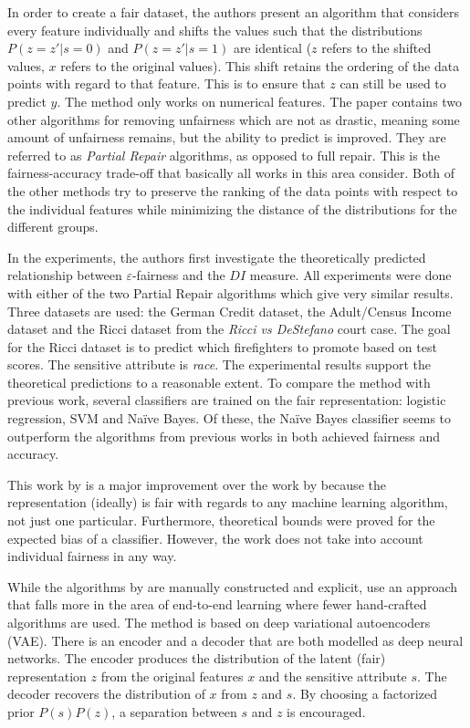 In order to create a fair dataset,
the authors present an algorithm that considers every feature individually
and shifts the values such that the distributions \(P(z=z'|s=0)\) and \(P(z=z'|s=1)\) are identical
(\(z\) refers to the shifted values, \(x\) refers to the original values).
This shift retains the ordering of the data points with regard to that feature.
This is to ensure that \(z\) can still be used to predict \(y\).
The method only works on numerical features.
The paper contains two other algorithms for removing unfairness which are not as drastic,
meaning some amount of unfairness remains, but the ability to predict is improved.
They are referred to as \emph{Partial Repair} algorithms, as opposed to full repair.
This is the fairness-accuracy trade-off that basically all works in this area consider.
Both of the other methods try to preserve the ranking of the data points
with respect to the individual features
while minimizing the distance of the distributions for the different groups.

In the experiments, the authors first investigate the theoretically predicted relationship
between \(\varepsilon\)-fairness and the \(DI\) measure.
All experiments were done with either of the two Partial Repair algorithms
which give very similar results.
Three datasets are used:
the German Credit dataset, the Adult/Census Income dataset
and the Ricci dataset from the \emph{Ricci vs DeStefano} court case.
The goal for the Ricci dataset is to predict which firefighters to promote based on test scores.
The sensitive attribute is \emph{race}.
The experimental results support the theoretical predictions to a reasonable extent.
To compare the method with previous work,
several classifiers are trained on the fair representation:
logistic regression, SVM and Na\"ive Bayes.
Of these, the Na\"ive Bayes classifier seems to outperform the algorithms from previous works
\citep{kamiran2009classifying,kamishima2011fairness,zemel2013learning}
in both achieved fairness and accuracy.

This work by \citet{feldman2015certifying} is a major improvement over the work by \citet{zemel2013learning}
because the representation (ideally) is fair with regards to any machine learning algorithm, not just one particular.
Furthermore, theoretical bounds were proved for the expected bias of a classifier.
However, the work does not take into account individual fairness in any way.

While the algorithms by \citet{feldman2015certifying} are manually constructed and explicit,
\citet{louizos2016variational} use an approach
that falls more in the area of end-to-end learning where fewer hand-crafted algorithms are used.
The method is based on deep variational autoencoders (VAE).
There is an encoder and a decoder that are both modelled as deep neural networks.
The encoder produces the distribution of the latent (fair) representation \(z\)
from the original features \(x\) and the sensitive attribute \(s\).
The decoder recovers the distribution of \(x\) from \(z\) and \(s\).
By choosing a factorized prior \(P(s)P(z)\), a separation between \(s\) and \(z\) is encouraged.

